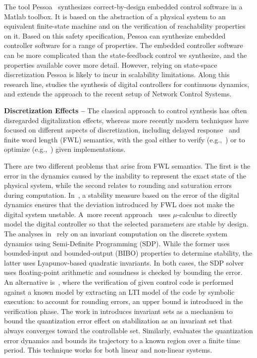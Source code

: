 \documentclass[sigconf]{llncs}
\begin{document}
The tool Pessoa~\cite{mazo2010pessoa} synthesizes correct-by-design embedded
control software in a Matlab toolbox.  It is based on the abstraction of a
physical system to an equivalent finite-state machine and on the
verification of reachability properties on it.  Based on this safety
specification, \mbox{Pessoa} can synthesize embedded controller software for
a range of properties.  The embedded controller software can be more
complicated than the state-feedback control we synthesize, and the
properties available cover more detail.  However, relying on state-space
discretization \mbox{Pessoa} is likely to incur in scalability limitations. 
Along this research line, \cite{Anta2010,liu16} studies the synthesis of
digital controllers for continuous dynamics, and \cite{zamani2014} extends
the approach to the recent setup of Network Control Systems.

\noindent\textbf{Discretization Effects --}
The classical approach to control synthesis has often disregarded
digitalization effects, whereas more recently modern techniques have focused
on different aspects of discretization, including delayed
response~\cite{Duggirala2015} and finite word length (FWL) semantics, with
the goal either to verify (e.g.,~\cite{daes20161}) or to optimize
(e.g.,~\cite{oudjida2014design}) given implementations.

There are two different problems that arise from FWL semantics.  The first
is the error in the dynamics caused by the inability to represent the exact
state of the physical system, while the second relates to rounding and
saturation errors during computation.  In~\cite{fialho1994stability}, a
stability measure based on the error of the digital dynamics ensures that
the deviation introduced by FWL does not make the digital system unstable. 
A~more recent approach~\cite{DBLP:journals/automatica/WuLCC09} uses
$\mu$-calculus to directly model the digital controller so that the selected
parameters are stable by design.  The analyses
in~\cite{DBLP:conf/hybrid/RouxJG15,DBLP:conf/hybrid/WangGRJF16} rely on an
invariant computation on the discrete system dynamics using Semi-Definite
Programming (SDP).  While the former uses bounded-input and bounded-output
(BIBO) properties to determine stability, the latter uses Lyapunov-based
quadratic invariants.  In both cases, the SDP solver uses floating-point
arithmetic and soundness is checked by bounding the error.  An alternative
is~\cite{park2016scalable}, where the verification of given control code is
performed against a known model by extracting an LTI model of the code by
symbolic execution: to account for rounding errors, an upper bound is
introduced in the verification phase.  The work in
\cite{picasso2003stabilization} introduces invariant sets as a mechanism to
bound the quantization error effect on stabilization as an invariant set
that always converges toward the controllable set.  Similarly,
\cite{liberzon2003hybrid} evaluates the quantization error dynamics and
bounds its trajectory to a known region over a finite time period.  This
technique works for both linear and non-linear systems.
\end{document}
